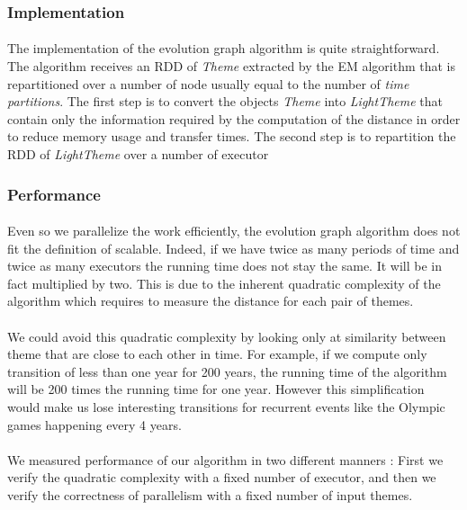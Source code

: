 \subsubsection{Implementation}
\label{sec:EvoGraphImplementation}
\paragraph{}
The implementation of the evolution graph algorithm is quite straightforward. The algorithm receives an RDD of \emph{Theme} extracted by the EM algorithm that is repartitioned over a number of node usually equal to the number of \emph{time partitions}. The first step is to convert the objects \emph{Theme} into \emph{LightTheme} that contain only the information required by the computation of the distance in order to reduce memory usage and transfer times. The second step is to repartition the RDD of \emph{LightTheme} over a number of executor 

\subsubsection{Performance}
\label{sec:EvoGraphPerformance}
\paragraph{}
Even so we parallelize the work efficiently, the evolution graph algorithm does not fit the definition of scalable. Indeed, if we have twice as many periods of time and twice as many executors the running time does not stay the same. It will be in fact multiplied by two. This is due to the inherent quadratic complexity of the algorithm which requires to measure the distance for each pair of themes.

\paragraph{}
We could avoid this quadratic complexity by looking only at similarity between theme that are close to each other in time. For example, if we compute only transition of less than one year for 200 years, the running time of the algorithm will be 200 times the running time for one year. However this simplification would make us lose interesting transitions for recurrent events like the Olympic games happening every 4 years. 

\paragraph{}
We measured performance of our algorithm in two different manners : First we verify the quadratic complexity with a fixed number of executor, and then we verify the correctness of parallelism with a fixed number of input themes.

